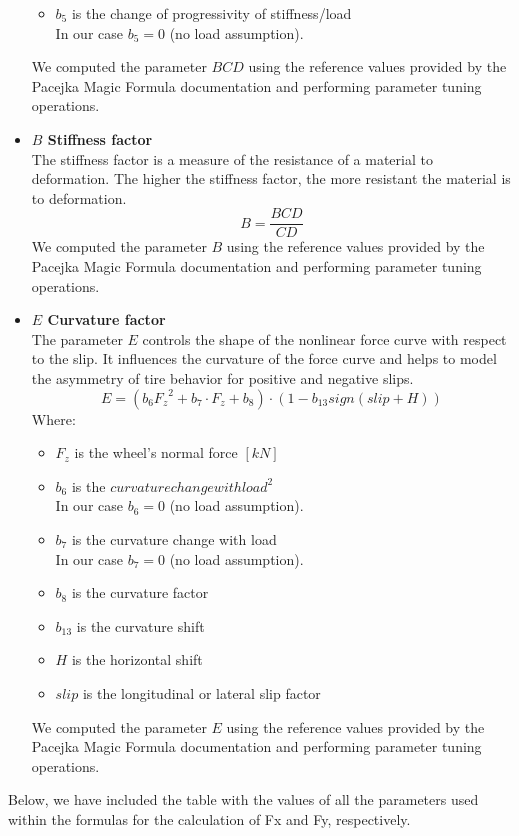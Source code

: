\begin{itemize}
\begin{itemize}
	  			\item $b_5$ is the change of progressivity of stiffness/load \\
	  				  In our case $b_5 = 0$ (no load assumption).
	  		\end{itemize}
  			We computed the parameter $BCD$ using the reference values provided by the Pacejka Magic Formula documentation and performing parameter tuning operations.
  	\item \textbf{$B$ Stiffness factor} \\
  			The stiffness factor is a measure of the resistance of a material to deformation. The higher the stiffness factor, the more resistant the material is to deformation.
  			\[B = \frac{BCD}{CD}\]
  			We computed the parameter $B$ using the reference values provided by the Pacejka Magic Formula documentation and performing parameter tuning operations.
  	\item \textbf{$E$ Curvature factor} \\
  			The parameter $E$ controls the shape of the nonlinear force curve with respect to the slip. It influences the curvature of the force curve and helps to model the asymmetry of tire behavior for positive and negative slips.
  			\[E = (b_6{F_z}^2 + b_7·F_z + b_8) · (1 - b_{13}sign(slip+H))\]
  			Where:
  			\begin{itemize}
  				\item $F_z$ is the wheel's normal force $[kN]$
  				\item $b_6$ is the ${curvature change with load}^2$ \\ 
  					  In our case $b_6 = 0$ (no load assumption).
  				\item $b_7$ is the curvature change with load \\
  					  In our case $b_7 = 0$ (no load assumption).
  				\item $b_8$ is the curvature factor
  				\item $b_{13}$ is the curvature shift
  				\item $H$ is the horizontal shift
  				\item $slip$ is the longitudinal or lateral slip factor
  			\end{itemize}
  			We computed the parameter $E$ using the reference values provided by the Pacejka Magic Formula documentation and performing parameter tuning operations.
\end{itemize}
Below, we have included the table with the values of all the parameters used within the formulas for the calculation of Fx and Fy, respectively.
